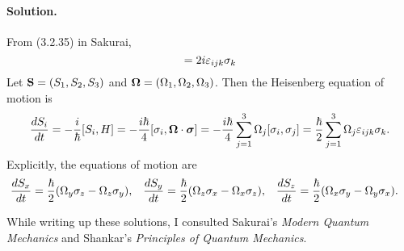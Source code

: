 \documentclass[11pt]{article}
\newcommand{\beq}{\begin{equation*}}
\newcommand{\eeq}{\end{equation*}}
\newenvironment{solution}
{
    \paragraph{Solution.}
    \ignorespaces
}
{
}
\begin{document}
\begin{solution}
	From (3.2.35) in Sakurai,
	\beq
		[\sigi, \sigj] = 2 i \lct \sigk
	\eeq
	Let $\mathbf{S} = (S_1, S_2, S_3)$ and $\boldsymbol{\Omega} = (\Omega_1, \Omega_2, \Omega_3)$.  Then the Heisenberg equation of motion is
	\beq
		\dv{\Si}{t} = -\frac{i}{\hbar} [\Si, H] = -\frac{i \hbar}{4} [\sigi, \Ods] = -\frac{i \hbar}{4} \sum_{j = 1}^3 \Omj [\sigi, \sigj] = \frac{\hbar}{2} \sum_{j = 1}^3 \Omj \lct \sigk.
	\eeq
	Explicitly, the equations of motion are
	\begin{align*}
		\dv{S_x}{t} &= \frac{\hbar}{2} (\Omega_y \sigma_z - \Omega_z \sigma_y), &
		\dv{S_y}{t} &= \frac{\hbar}{2} (\Omega_z \sigma_x - \Omega_x \sigma_z), &
		\dv{S_z}{t} &= \frac{\hbar}{2} (\Omega_x \sigma_y - \Omega_y \sigma_x).
	\end{align*}
\end{solution}


\vfill
While writing up these solutions, I consulted Sakurai's \emph{Modern Quantum Mechanics} and Shankar's \emph{Principles of Quantum Mechanics}.
\end{document}
